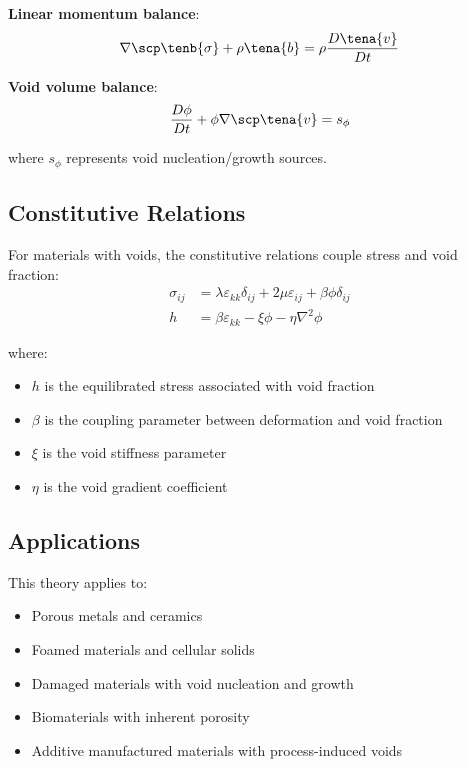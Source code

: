 \textbf{Linear momentum balance}:
\begin{equation}
\nabla \scp \tenb{\sigma} + \rho \tena{b} = \rho \frac{D\tena{v}}{Dt}
\end{equation}

\textbf{Void volume balance}:
\begin{equation}
\frac{D\phi}{Dt} + \phi \nabla \scp \tena{v} = s_\phi
\end{equation}

where $s_\phi$ represents void nucleation/growth sources.

\subsection{Constitutive Relations}

For materials with voids, the constitutive relations couple stress and void fraction:
\begin{align}
\sigma_{ij} &= \lambda \varepsilon_{kk} \delta_{ij} + 2\mu \varepsilon_{ij} + \beta \phi \delta_{ij}\\
h &= \beta \varepsilon_{kk} - \xi \phi - \eta \nabla^2 \phi
\end{align}

where:
\begin{itemize}
\item $h$ is the equilibrated stress associated with void fraction
\item $\beta$ is the coupling parameter between deformation and void fraction
\item $\xi$ is the void stiffness parameter
\item $\eta$ is the void gradient coefficient
\end{itemize}

\subsection{Applications}

This theory applies to:
\begin{itemize}
\item Porous metals and ceramics
\item Foamed materials and cellular solids
\item Damaged materials with void nucleation and growth
\item Biomaterials with inherent porosity
\item Additive manufactured materials with process-induced voids
\end{itemize}

